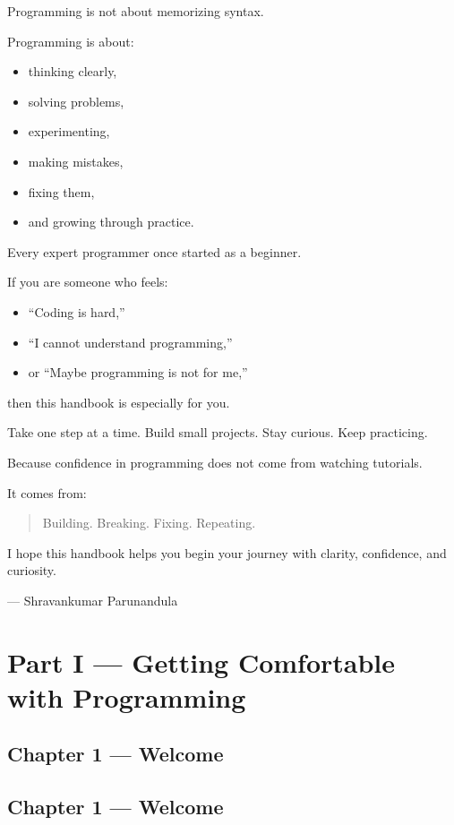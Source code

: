 \documentclass[
  letterpaper,
  DIV=11,
  numbers=noendperiod]{scrreprt}
\providecommand{\tightlist}{%
  \setlength{\itemsep}{0pt}\setlength{\parskip}{0pt}}
\begin{document}
Programming is not about memorizing syntax.

Programming is about:

\begin{itemize}
\tightlist
\item
  thinking clearly,
\item
  solving problems,
\item
  experimenting,
\item
  making mistakes,
\item
  fixing them,
\item
  and growing through practice.
\end{itemize}

Every expert programmer once started as a beginner.

If you are someone who feels:

\begin{itemize}
\tightlist
\item
  ``Coding is hard,''
\item
  ``I cannot understand programming,''
\item
  or ``Maybe programming is not for me,''
\end{itemize}

then this handbook is especially for you.

Take one step at a time. Build small projects. Stay curious. Keep
practicing.

Because confidence in programming does not come from watching tutorials.

It comes from:

\begin{quote}
Building. Breaking. Fixing. Repeating.
\end{quote}

I hope this handbook helps you begin your journey with clarity,
confidence, and curiosity.

--- Shravankumar Parunandula

\part{Part I --- Getting Comfortable with Programming}

\chapter{Chapter 1 --- Welcome}\label{chapter-1-welcome}

\chapter*{Chapter 1 --- Welcome}\label{chapter-1-welcome-1}
\end{document}
